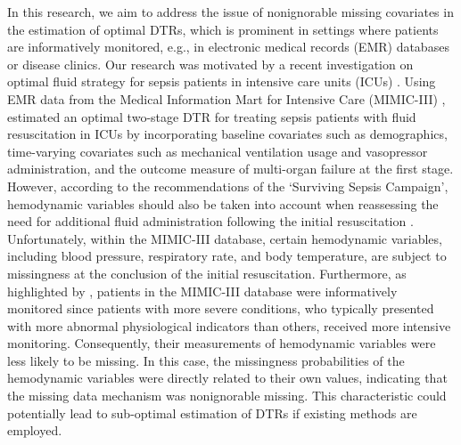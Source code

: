 \documentclass[12pt]{article}
\begin{document}
In this research, we aim to address the issue of nonignorable missing covariates in the estimation of optimal DTRs, which is prominent in settings where patients are informatively monitored, e.g., in electronic medical records (EMR) databases or disease clinics. Our research was motivated by a recent investigation on optimal fluid strategy for sepsis patients in intensive care units (ICUs) \citep{Speth_et_al_2022}. 
Using EMR data from the Medical Information Mart for Intensive Care (MIMIC-III) \citep{Johnson_et_al_2016}, \cite{Speth_et_al_2022} estimated an optimal two-stage DTR for treating sepsis patients with fluid resuscitation in ICUs by incorporating baseline covariates such as demographics, time-varying covariates such as mechanical ventilation usage and vasopressor administration,  and the outcome measure of multi-organ failure at the first stage. However, according to the recommendations of the `Surviving Sepsis Campaign', hemodynamic variables should also be taken into account when reassessing the need for additional fluid administration following the initial resuscitation \citep{Rhodes_et_al_2017}. Unfortunately,  within the MIMIC-III database, certain hemodynamic variables, including blood pressure, respiratory rate, and body temperature, are subject to missingness at the conclusion of the initial resuscitation. Furthermore,  as highlighted by \cite{Awad_et_al_2017},  patients in the MIMIC-III database were informatively monitored since patients with more severe conditions, who typically presented with more abnormal physiological indicators than others, received more intensive monitoring.  Consequently, their measurements of hemodynamic variables were less likely to be missing. In this case, the missingness probabilities of the hemodynamic variables were directly related to their own values, indicating that the missing data mechanism was nonignorable missing. This characteristic could potentially lead to sub-optimal estimation of DTRs if existing methods are employed.
\end{document}
